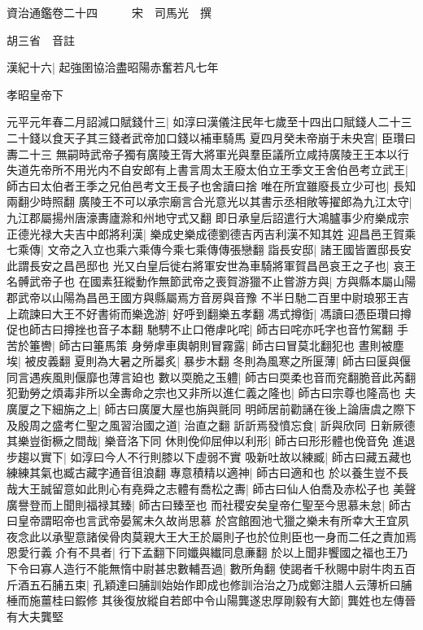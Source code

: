 資治通鑑卷二十四　　　宋　司馬光　撰

胡三省　音註

漢紀十六|{
	起強圉協洽盡昭陽赤奮若凡七年}


孝昭皇帝下

元平元年春二月詔減口賦錢什三|{
	如淳曰漢儀注民年七歲至十四出口賦錢人二十三二十錢以食天子其三錢者武帝加口錢以補車騎馬}
夏四月癸未帝崩于未央宫|{
	臣瓚曰夀二十三}
無嗣時武帝子獨有廣陵王胥大將軍光與羣臣議所立咸持廣陵王王本以行失道先帝所不用光内不自安郎有上書言周太王廢太伯立王季文王舍伯邑考立武王|{
	師古曰太伯者王季之兄伯邑考文王長子也舍讀曰捨}
唯在所宜雖廢長立少可也|{
	長知兩翻少時照翻}
廣陵王不可以承宗廟言合光意光以其書示丞相敞等擢郎為九江太守|{
	九江郡屬揚州唐濠夀廬滁和州地守式又翻}
即日承皇后詔遣行大鴻臚事少府樂成宗正德光禄大夫吉中郎將利漢|{
	樂成史樂成德劉德吉丙吉利漢不知其姓}
迎昌邑王賀乘七乘傳|{
	文帝之入立也乘六乘傳今乘七乘傳傳張戀翻}
詣長安邸|{
	諸王國皆置邸長安此謂長安之昌邑邸也}
光又白皇后徙右將軍安世為車騎將軍賀昌邑哀王之子也|{
	哀王名髆武帝子也}
在國素狂縱動作無節武帝之喪賀游獵不止嘗游方與|{
	方與縣本屬山陽郡武帝以山陽為昌邑王國方與縣屬焉方音房與音豫}
不半日馳二百里中尉琅邪王吉上疏諫曰大王不好書術而樂逸游|{
	好呼到翻樂五孝翻}
馮式撙衘|{
	馮讀曰憑臣瓚曰撙促也師古曰撙挫也音子本翻}
馳騁不止口倦虖叱咤|{
	師古曰咤亦吒字也音竹駕翻}
手苦於箠轡|{
	師古曰箠馬策}
身勞虖車輿朝則冒霧露|{
	師古曰冒莫北翻犯也}
晝則被塵埃|{
	被皮義翻}
夏則為大暑之所㬥炙|{
	暴步木翻}
冬則為風寒之所匽薄|{
	師古曰匽與偃同言遇疾風則偃靡也薄言廹也}
數以耎脆之玉軆|{
	師古曰耎柔也音而兖翻脆音此芮翻}
犯勤勞之煩毒非所以全夀命之宗也又非所以進仁義之隆也|{
	師古曰宗尊也隆高也}
夫廣厦之下細旃之上|{
	師古曰廣厦大屋也旃與氈同}
明師居前勸誦在後上論唐虞之際下及殷周之盛考仁聖之風習治國之道|{
	治直之翻}
訢訢焉發憤忘食|{
	訢與欣同}
日新厥德其樂豈衘橛之間哉|{
	樂音洛下同}
休則俛仰屈伸以利形|{
	師古曰形形體也俛音免}
進退步趨以實下|{
	如淳曰今人不行則膝以下虛弱不實}
吸新吐故以練臧|{
	師古曰藏五藏也練練其氣也臧古藏字通音徂浪翻}
專意積精以適神|{
	師古曰適和也}
於以養生豈不長哉大王誠留意如此則心有堯舜之志體有喬松之夀|{
	師古曰仙人伯喬及赤松子也}
美聲廣譽登而上聞則福禄其臻|{
	師古曰臻至也}
而社稷安矣皇帝仁聖至今思慕未怠|{
	師古曰皇帝謂昭帝也言武帝晏駕未久故尚思慕}
於宫館囿池弋獵之樂未有所幸大王宜夙夜念此以承聖意諸侯骨肉莫親大王大王於屬則子也於位則臣也一身而二任之責加焉恩愛行義介有不具者|{
	行下孟翻下同孅與纎同息亷翻}
於以上聞非饗國之福也王乃下令曰寡人造行不能無惰中尉甚忠數輔吾過|{
	數所角翻}
使謁者千秋賜中尉牛肉五百斤酒五石脯五束|{
	孔穎達曰脯訓始始作即成也修訓治治之乃成鄭注腊人云薄析曰脯棰而施薑桂曰鍜修}
其後復放縱自若郎中令山陽龔遂忠厚剛毅有大節|{
	龔姓也左傳晉有大夫龔堅}
